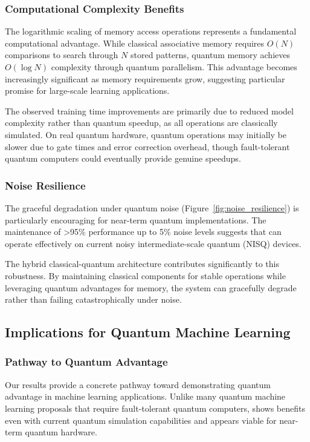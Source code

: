 \subsubsection{Computational Complexity Benefits}

The logarithmic scaling of memory access operations represents a fundamental computational advantage. While classical associative memory requires $O(N)$ comparisons to search through $N$ stored patterns, quantum memory achieves $O(\log N)$ complexity through quantum parallelism. This advantage becomes increasingly significant as memory requirements grow, suggesting particular promise for large-scale learning applications.

The observed training time improvements are primarily due to reduced model complexity rather than quantum speedup, as all operations are classically simulated. On real quantum hardware, quantum operations may initially be slower due to gate times and error correction overhead, though fault-tolerant quantum computers could eventually provide genuine speedups.

\subsubsection{Noise Resilience}

The graceful degradation under quantum noise (Figure~\ref{fig:noise_resilience}) is particularly encouraging for near-term quantum implementations. The maintenance of >95\% performance up to 5\% noise levels suggests that \qmann can operate effectively on current noisy intermediate-scale quantum (NISQ) devices.

The hybrid classical-quantum architecture contributes significantly to this robustness. By maintaining classical components for stable operations while leveraging quantum advantages for memory, the system can gracefully degrade rather than failing catastrophically under noise.

\subsection{Implications for Quantum Machine Learning}

\subsubsection{Pathway to Quantum Advantage}

Our results provide a concrete pathway toward demonstrating quantum advantage in machine learning applications. Unlike many quantum machine learning proposals that require fault-tolerant quantum computers, \qmann shows benefits even with current quantum simulation capabilities and appears viable for near-term quantum hardware.

